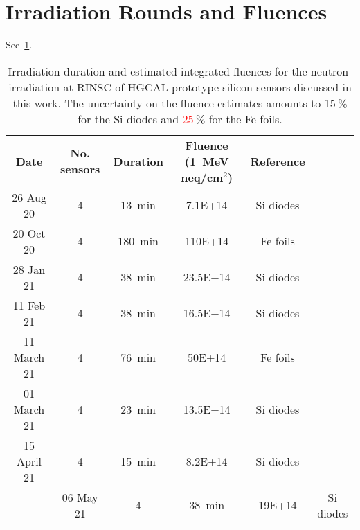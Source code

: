 \section{Irradiation Rounds and Fluences}
\label{appendix:irrad_rounds}
See~\ref{table:irrads}.
\begin{table}[h]
	\centering
	\begin{tabular}{c||ccccc}
		\textbf{Date} & \textbf{No. sensors} & \textbf{Duration} & \textbf{Fluence (\SI{1}{\mega\eV} neq/cm$^2$)} & \textbf{Reference} \\
		26 Aug 20 & 4 & \SI{13}{\minute} & 7.1E+14} & Si diodes \\
		20 Oct 20 & 4 & \SI{180}{\minute} & 110E+14} & Fe foils \\
		28 Jan 21 & 4 & \SI{38}{\minute} & 23.5E+14} & Si diodes \\
		11 Feb 21 & 4 & \SI{38}{\minute} & 16.5E+14} & Si diodes \\
		11 March 21 & 4 & \SI{76}{\minute} & 50E+14} & Fe foils \\
		01 March 21 & 4 & \SI{23}{\minute} & 13.5E+14} & Si diodes \\
		15 April 21 & 4 & \SI{15}{\minute} & 8.2E+14} & Si diodes \\
		& 06 May 21 & 4 & \SI{38}{\minute} & 19E+14} & Si diodes \\
	\end{tabular}
	\caption{Irradiation duration and estimated integrated fluences for the neutron-irradiation at RINSC of HGCAL prototype silicon sensors discussed in this work.
	The uncertainty on the fluence estimates amounts to 15$~\%$ for the Si diodes and \textcolor{red}{25}$~\%$ for the Fe foils.
	}
	\label{table:irrads}
\end{table}


